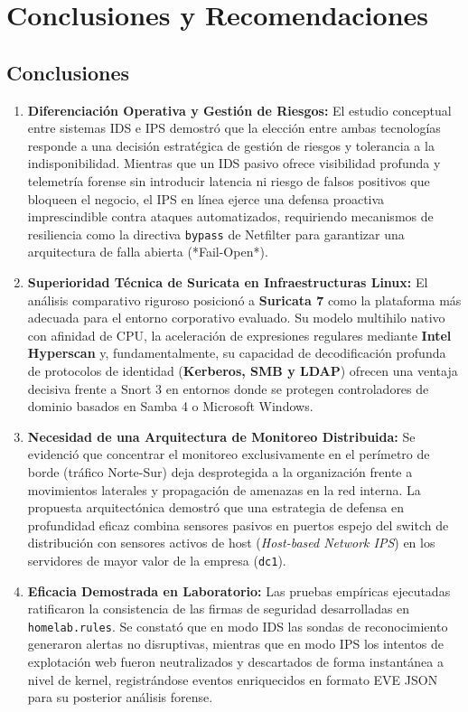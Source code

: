
\section{Conclusiones y Recomendaciones}

\subsection{Conclusiones}

\begin{enumerate}
  \item \textbf{Diferenciación Operativa y Gestión de Riesgos:} El estudio conceptual entre sistemas IDS e IPS demostró que la elección entre ambas tecnologías responde a una decisión estratégica de gestión de riesgos y tolerancia a la indisponibilidad. Mientras que un IDS pasivo ofrece visibilidad profunda y telemetría forense sin introducir latencia ni riesgo de falsos positivos que bloqueen el negocio, el IPS en línea ejerce una defensa proactiva imprescindible contra ataques automatizados, requiriendo mecanismos de resiliencia como la directiva \texttt{bypass} de Netfilter para garantizar una arquitectura de falla abierta (*Fail-Open*).
  \item \textbf{Superioridad Técnica de Suricata en Infraestructuras Linux:} El análisis comparativo riguroso posicionó a \textbf{Suricata 7} como la plataforma más adecuada para el entorno corporativo evaluado. Su modelo multihilo nativo con afinidad de CPU, la aceleración de expresiones regulares mediante \textbf{Intel Hyperscan} y, fundamentalmente, su capacidad de decodificación profunda de protocolos de identidad (\textbf{Kerberos, SMB y LDAP}) ofrecen una ventaja decisiva frente a Snort 3 en entornos donde se protegen controladores de dominio basados en Samba 4 o Microsoft Windows.
  \item \textbf{Necesidad de una Arquitectura de Monitoreo Distribuida:} Se evidenció que concentrar el monitoreo exclusivamente en el perímetro de borde (tráfico Norte-Sur) deja desprotegida a la organización frente a movimientos laterales y propagación de amenazas en la red interna. La propuesta arquitectónica demostró que una estrategia de defensa en profundidad eficaz combina sensores pasivos en puertos espejo del switch de distribución con sensores activos de host (\textit{Host-based Network IPS}) en los servidores de mayor valor de la empresa (\texttt{dc1}).
  \item \textbf{Eficacia Demostrada en Laboratorio:} Las pruebas empíricas ejecutadas ratificaron la consistencia de las firmas de seguridad desarrolladas en \texttt{homelab.rules}. Se constató que en modo IDS las sondas de reconocimiento generaron alertas no disruptivas, mientras que en modo IPS los intentos de explotación web fueron neutralizados y descartados de forma instantánea a nivel de kernel, registrándose eventos enriquecidos en formato EVE JSON para su posterior análisis forense.
\end{enumerate}

